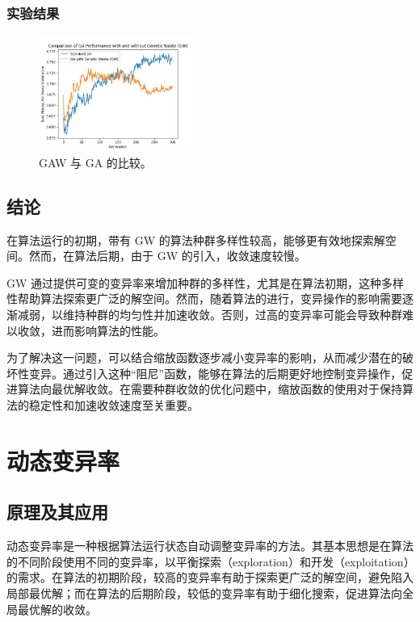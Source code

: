 \documentclass[journal=gmj]{report}%
\theoremstyle{definition}
\numberwithin{equation}{section}
\begin{document}
\subsubsection{实验结果}

\begin{figure}[H]
  \begin{center}
    \includegraphics[width=0.45\textwidth]{../assets/img/comparison_gw_vs_standard.jpg}
  \end{center}
  \caption{GAW 与 GA 的比较。}
  \label{fig:comparison}
\end{figure}

\subsection{结论}

在算法运行的初期，带有 GW 的算法种群多样性较高，能够更有效地探索解空间。然而，在算法后期，由于 GW 的引入，收敛速度较慢。

GW 通过提供可变的变异率来增加种群的多样性，尤其是在算法初期，这种多样性帮助算法探索更广泛的解空间。然而，随着算法的进行，变异操作的影响需要逐渐减弱，以维持种群的均匀性并加速收敛。否则，过高的变异率可能会导致种群难以收敛，进而影响算法的性能。

为了解决这一问题，可以结合缩放函数逐步减小变异率的影响，从而减少潜在的破坏性变异。通过引入这种“阻尼”函数，能够在算法的后期更好地控制变异操作，促进算法向最优解收敛。在需要种群收敛的优化问题中，缩放函数的使用对于保持算法的稳定性和加速收敛速度至关重要。


\section{动态变异率}

\subsection{原理及其应用}

动态变异率是一种根据算法运行状态自动调整变异率的方法。其基本思想是在算法的不同阶段使用不同的变异率，以平衡探索（exploration）和开发（exploitation）的需求。在算法的初期阶段，较高的变异率有助于探索更广泛的解空间，避免陷入局部最优解；而在算法的后期阶段，较低的变异率有助于细化搜索，促进算法向全局最优解的收敛。
\end{document}
